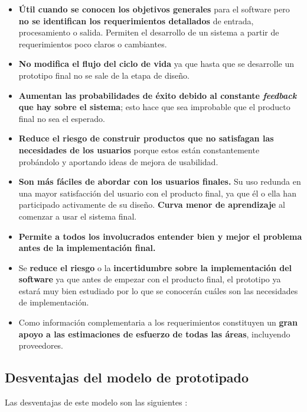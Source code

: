 \begin{itemize}
    \item \textbf{Útil cuando se conocen los objetivos generales} para el software pero \textbf{no se identifican los requerimientos  detallados} de entrada, procesamiento o salida. Permiten el desarrollo de un sistema a partir de requerimientos  poco claros o cambiantes.
    \item \textbf{No modifica el flujo del ciclo de vida} ya que hasta que se desarrolle un prototipo final no se sale de la etapa de diseño.
    \item \textbf{Aumentan las probabilidades de éxito debido al constante \textit{feedback} que hay sobre el sistema}; esto hace que sea improbable que el producto final no sea el esperado.
    \item \textbf{Reduce el riesgo de construir productos que no satisfagan las necesidades de los usuarios} porque estos están constantemente probándolo y aportando ideas de mejora de usabilidad.
    \item  \textbf{Son más fáciles de abordar con los usuarios finales.} Su uso redunda en una mayor satisfacción del usuario con el producto final, ya que él o ella han participado activamente de su diseño. \textbf{Curva menor de aprendizaje} al comenzar a usar el sistema final. 
    \item \textbf{Permite a todos los involucrados entender bien y mejor el problema antes de la implementación final.}
    \item Se \textbf{reduce el riesgo} o la \textbf{incertidumbre sobre la implementación del software} ya que antes de empezar con el producto final, el prototipo ya estará muy bien estudiado por lo que se conocerán cuáles son las necesidades de implementación.
    \item Como información complementaria a los requerimientos  constituyen un \textbf{gran apoyo a las estimaciones de esfuerzo de todas las áreas}, incluyendo proveedores.
\end{itemize}

\subsection{Desventajas del modelo de prototipado}
Las desventajas de este modelo son las siguientes \cite{modeloPrototipos1, modeloPrototipos2, ventajasDesventajasPrototipos}: 

